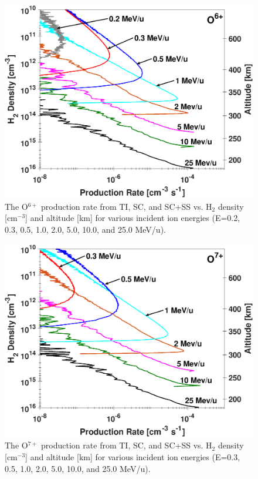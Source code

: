 \documentclass[draft]{agujournal2018}
\begin{document}
\begin{figure}[ht]
    \centering
    \includegraphics[width=\textwidth]{Figures/O6CXProd.eps}
    \caption{The O$^{6+}$ production rate from TI, SC, and SC+SS vs. H$_2$ density [cm$^{-3}$] and altitude [km] for various incident ion energies (E=0.2, 0.3, 0.5, 1.0, 2.0, 5.0, 10.0, and 25.0 MeV/u).}
    \label{fig:O6+Prod}
\end{figure}

\begin{figure}[ht]
    \centering
    \includegraphics[width=\textwidth]{Figures/O7CXProd.eps}
    \caption{The O$^{7+}$ production rate from TI, SC, and SC+SS vs. H$_2$ density [cm$^{-3}$] and altitude [km] for various incident ion energies (E=0.3, 0.5, 1.0, 2.0, 5.0, 10.0, and 25.0 MeV/u).}
    \label{fig:O7+Prod}
\end{figure}
\end{document}
